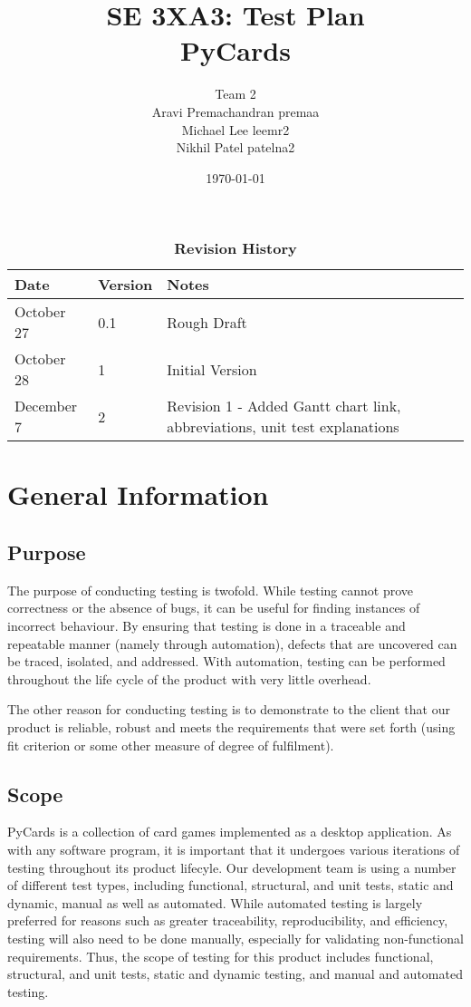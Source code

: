 \documentclass[12pt, titlepage]{article}
\title{SE 3XA3: Test Plan\\PyCards}
\author{Team 2
	\\ Aravi Premachandran  premaa
	\\ Michael Lee  leemr2
	\\ Nikhil Patel  patelna2
}
\date{\today}
\begin{document}
	\maketitle
	\tableofcontents
	\listoftables
	\listoffigures
	\begin{table}[bp]
		\caption{\bf Revision History}
		\begin{tabularx}{\textwidth}{p{3cm}p{2cm}X}
			\toprule {\bf Date} & {\bf Version} & {\bf Notes}\\
			\midrule
			October 27 & 0.1 & Rough Draft\\
			October 28 & 1 & Initial Version\\
			December 7 & 2 & Revision 1 - 
			Added Gantt chart link, abbreviations, unit test explanations\\
			\bottomrule
		\end{tabularx}
	\end{table}
	\newpage
	\section{General Information}
	\subsection{Purpose}
	\indent \indent The purpose of conducting testing is twofold. While testing 
	cannot prove correctness or the absence of bugs, it can be useful for 
	finding instances of incorrect behaviour. By ensuring that testing is done 
	in a traceable and repeatable manner (namely through automation), defects 
	that are uncovered can be traced, isolated, and addressed. With automation, 
	testing can be performed throughout the life cycle of the product with very 
	little overhead.\par
	The other reason for conducting testing is to demonstrate to the 
	client	that our product is reliable, robust and meets the requirements 
	that were set forth (using fit criterion or some other measure of degree
	of fulfilment).
	\subsection{Scope}
	\indent\indent PyCards is a collection of card games implemented as a 
	desktop application. As with any software program, it is important that it 
	undergoes various iterations of testing throughout its product lifecyle.
	Our development team is using a number of different test types, including 
	functional, structural, and unit tests, static and dynamic, manual as well 
	as automated.
	While automated testing is largely preferred for reasons such as greater 
	traceability, reproducibility, and efficiency, testing will also need to be 
	done manually, especially for validating non-functional requirements.
	Thus, the scope of testing for this product includes functional, 
	structural, and unit tests, static and dynamic testing, and manual and 
	automated testing.
	
\end{document}
